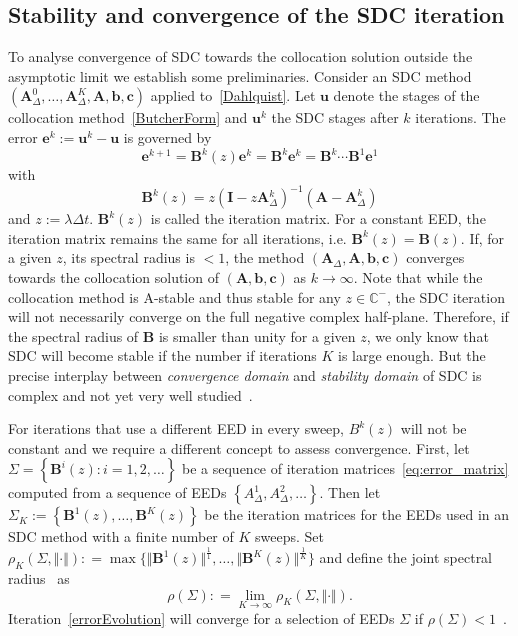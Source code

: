 \documentclass[sn-mathphys-num]{sn-jnl}%
\newcommand{\reva}[1]{#1}%
\newcommand{\coloneq}{\mathrel{\mathop:}=}
\theoremstyle{thmstyleone}%
\theoremstyle{thmstyletwo}%
\theoremstyle{thmstylethree}%
\begin{document}
\subsection{Stability and convergence of the SDC iteration}
To analyse convergence of SDC towards the collocation solution outside the asymptotic limit we establish some preliminaries. 
Consider an SDC method $(\bm{A}_\Delta^0, \ldots ,\bm{A}^K_\Delta, \bm{A}, \bm{b}, \bm{c})$ \reva{applied to~\eqref{Dahlquist}.}
Let $\bm{u}$ denote the stages of the collocation method~\eqref{ButcherForm} and $\bm{u}^k$ the SDC stages after $k$ iterations.
The error $\bm{e}^{k} := \bm{u}^k - \bm{u}$ is governed by 
\begin{equation}
\bm{e}^{k+1} = \bm{B}^k(z) \bm{e}^k =  \bm{B}^k \bm{e}^{k} = \bm{B}^k \dotsm \bm{B}^1 \bm{e}^1
\label{errorEvolution}
\end{equation}
 with 
 \begin{equation}
	\label{eq:error_matrix}
	\bm{B}^k(z) = z(\bm{I} - z\bm{A}{_\Delta^k})^{-1}(\bm{A}- \bm{A}_\Delta^k)
 \end{equation}
 \reva{and $z := \lambda \Delta t$}.  $\bm{B}^k(z)$ is called the iteration matrix. 
 \reva{For a constant EED, the iteration matrix remains the same for all iterations}, i.e. $\bm{B}^k(z) = \bm{B}(z)$.
 \reva{If, for a given $z$}, its spectral radius is $<1$, the method $(\bm{A}_\Delta, \bm{A}, \bm{b}, \bm{c})$ converges towards the collocation solution of $(\bm{A}, \bm{b}, \bm{c})$ as $k \to \infty$. 
 \reva{Note that while the collocation method is A-stable and thus stable for any $z \in \mathbb{C}^{-}$, the SDC iteration will not necessarily converge on the full negative complex half-plane.
 Therefore, if the spectral radius of $\bm{B}$ is smaller than unity for a given $z$, we only know that SDC will become stable if the number if iterations $K$ is large enough.
 But the precise interplay between \emph{convergence domain} and \emph{stability domain} of SDC is complex and not yet very well studied~\cite{AkramovEtAl2024}.}
 
\reva{For iterations that use a different EED in every sweep, $B^k(z)$ will not be constant and we require a different concept to assess convergence.
First, let $\Sigma = \left\{ \bm{B}^{i}(z) : i = 1, 2, \ldots \right\}$ be a sequence of iteration matrices~\eqref{eq:error_matrix} computed from a sequence of EEDs $\left\{ A^1_{\Delta}, A^2_{\Delta}, \ldots \right\}$.
Then let $ \Sigma_K := \left\{ \bm{B}^1(z), \ldots, \bm{B}^K(z) \right\} $ be the iteration matrices for the EEDs used in an SDC method with a finite number of $K$ sweeps.
Set $\rho_K (\Sigma, \Vert \cdot \Vert)\coloneq \max\{\Vert \bm{B}^{1}(z) \Vert^{\frac{1}{1}}, \ldots, \Vert \bm{B}^{K}(z) \Vert^{\frac{1}{K}} \}$} and define the joint spectral radius~\citep{rota1960} as
\begin{equation*}
	\rho(\Sigma) \coloneq \lim_{K \to \infty} \rho_K (\Sigma, \Vert \cdot \Vert).
\end{equation*}
Iteration~\eqref{errorEvolution} will converge for a selection of EEDs $\Sigma$ if $\rho(\Sigma) < 1$~\citep[Theorem 1]{Berger1992}.
\end{document}

